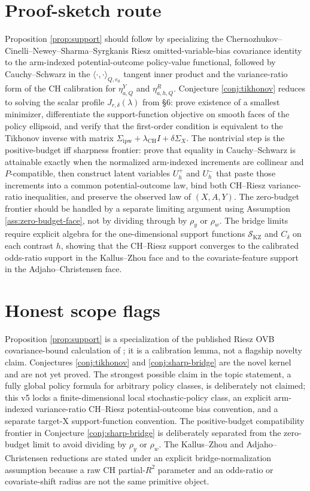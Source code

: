 \documentclass[11pt]{article}
\theoremstyle{definition}
\theoremstyle{plain}
\theoremstyle{remark}
\begin{document}
\section{Proof-sketch route}
Proposition \ref{prop:support} should follow by specializing the Chernozhukov--Cinelli--Newey--Sharma--Syrgkanis Riesz omitted-variable-bias covariance identity to the arm-indexed potential-outcome policy-value functional, followed by Cauchy--Schwarz in the $\langle\cdot,\cdot\rangle_{Q,e_0}$ tangent inner product and the variance-ratio form of the CH calibration for $\eta^Y_{a,Q}$ and $\eta^R_{a,h,Q}$. Conjecture \ref{conj:tikhonov} reduces to solving the scalar profile $J_{r,\delta}(\lambda)$ from \S6: prove existence of a smallest minimizer, differentiate the support-function objective on smooth faces of the policy ellipsoid, and verify that the first-order condition is equivalent to the Tikhonov inverse with matrix $\Sigma_{\mathrm{ipw}}+\lambda_{\mathrm{CH}}I+\delta\Sigma_X$. The nontrivial step is the positive-budget iff sharpness frontier: prove that equality in Cauchy--Schwarz is attainable exactly when the normalized arm-indexed increments are collinear and $P$-compatible, then construct latent variables $U_h^+$ and $U_h^-$ that paste those increments into a common potential-outcome law, bind both CH--Riesz variance-ratio inequalities, and preserve the observed law of $(X,A,Y)$. The zero-budget frontier should be handled by a separate limiting argument using Assumption \ref{ass:zero-budget-face}, not by dividing through by $\rho_y$ or $\rho_w$. The bridge limits require explicit algebra for the one-dimensional support functions $\mathcal S_{\mathrm{KZ}}$ and $C_\delta$ on each contrast $h$, showing that the CH--Riesz support converges to the calibrated odds-ratio support in the Kallus--Zhou face and to the covariate-feature support in the Adjaho--Christensen face.

\section{Honest scope flags}
Proposition \ref{prop:support} is a specialization of the published Riesz OVB covariance-bound calculation of \citet{ChernozhukovCinelliNeweySharmaSyrgkanis2022}; it is a calibration lemma, not a flagship novelty claim. Conjectures \ref{conj:tikhonov} and \ref{conj:sharp-bridge} are the novel kernel and are not yet proved. The strongest possible claim in the topic statement, a fully global policy formula for arbitrary policy classes, is deliberately not claimed; this v5 locks a finite-dimensional local stochastic-policy class, an explicit arm-indexed variance-ratio CH--Riesz potential-outcome bias convention, and a separate target-X support-function convention. The positive-budget compatibility frontier in Conjecture \ref{conj:sharp-bridge} is deliberately separated from the zero-budget limit to avoid dividing by $\rho_y$ or $\rho_w$. The Kallus--Zhou and Adjaho--Christensen reductions are stated under an explicit bridge-normalization assumption because a raw CH partial-$R^2$ parameter and an odds-ratio or covariate-shift radius are not the same primitive object.
\end{document}
